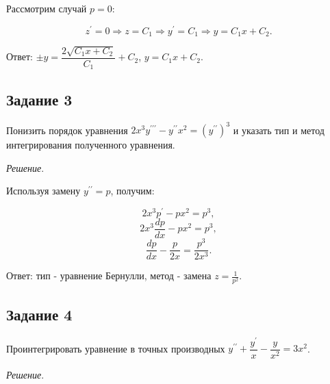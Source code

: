 \documentclass[11pt, a4paper]{article}
\begin{document}
	\par
	Рассмотрим случай $p = 0$:
	
	\begin{equation*}
    	z^\prime = 0 \Rightarrow z = C_ 1 \Rightarrow y^\prime = C_1 \Rightarrow y = C_1x + C_2.
	\end{equation*}
	
	\par\noindent
	Ответ: $\pm y = \dfrac{2\sqrt{C_1x + C_2}}{C_1} + C_2$, $y = C_1x + C_2$.
	
	
	\subsection*{Задание 3}
	
	\par
	Понизить порядок уравнения $2x^3 y^{\prime\prime\prime} - y^{\prime\prime} x^2 = (y^{\prime\prime})^3$ и указать тип и метод интегрирования полученного уравнения.
	
	\vspace{0.2cm}
	\par
	\textit{Решение}.
	
	\par
	Используя замену $y^{\prime\prime} = p$, получим:
	
	\begin{equation*}
    	2x^3 p^\prime - px^2 = p^3,
	\end{equation*}
	\begin{equation*}
    	2x^3 \dfrac{dp}{dx} - px^2 = p^3,
	\end{equation*}
	\begin{equation*}
    	\dfrac{dp}{dx} - \frac{p}{2x} = \frac{p^3}{2x^3}.
	\end{equation*}
	
	\par\noindent
	Ответ: тип - уравнение Бернулли, метод - замена $z = \frac{1}{p^2}$.
	
	\subsection*{Задание 4}
	
	\par
	Проинтегрировать уравнение в точных производных $y^{\prime\prime} + \dfrac{y^\prime}{x} - \dfrac{y}{x^2} = 3x^2$.
	
	\vspace{0.2cm}
	\par
	\textit{Решение}.
	
\end{document}

